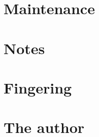 \documentclass[b5paper]{memoir}
\begin{document}
\section{Maintenance}


\section{Notes}


\appendix
\appendixpage

\section{Fingering}


\newpage

\section{The author}


\backmatter
\end{document}
